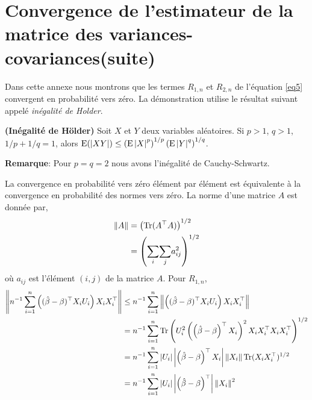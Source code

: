 \section{Convergence de l'estimateur de la matrice des variances-covariances(suite)}
Dans cette annexe nous montrons que les termes $R_{1,n}$ et $R_{2,n}$ de l'équation \eqref{eq5} convergent en probabilité vers zéro. La démonstration utilise le résultat suivant appelé \emph{inégalité de Holder}.
\begin{propriete}\textbf{(Inégalité de Hölder)} Soit $X$ et $Y$ deux variables aléatoires. Si $p>1$, $q>1$,  $1/p +1/q =1$,  alors $\operatorname{E}(\left\vert {XY} \right\vert) \leq \left(\operatorname{E}\left\vert {X} \right\vert^p\right)^{1/p}
\left(\operatorname{E}\left\vert {Y} \right\vert^q\right)^{1/q}$.
\end{propriete}
\textbf{Remarque}: Pour $p = q = 2$ nous avons l'inégalité de Cauchy-Schwartz.

La convergence en probabilité vers zéro élément par élément est équivalente à la convergence en probabilité des normes vers zéro. La norme d'une matrice $A$ est donnée par,
\begin{align*}
\left\Vert {A} \right\Vert& = \left(\operatorname{Tr}(A^\top A)\right)^{1/2}\\
&= \left(\underset{i}{\sum}\underset{j}{\sum}a_{ij}^2\right)^{1/2}
\end{align*}
où $a_{ij}$ est l'élément $(i, j)$ de la matrice $A$. Pour $R_{1,n}$,
\begin{align*}
\left\Vert {n^{-1}\sum_{i=1}^n\left((\hat{\beta}- \beta)^\top X_iU_i\right)X_iX_i^\top} \right\Vert &\leq 
n^{-1} \sum_{i=1}^n \left\Vert {\left((\hat{\beta}- \beta)^\top X_iU_i\right)X_iX_i^\top} \right\Vert\\
 &= n^{-1} \sum_{i=1}^n \operatorname{Tr}\left(U_i^2\left(\left(\hat{\beta}- \beta\right)^\top X_i\right)^2 X_iX_i^\top X_iX_i^\top\right)^{1/2}\\
 &=n^{-1} \sum_{i=1}^n \left\vert {U_i} \right\vert\left\vert {\left(\hat{\beta}- \beta\right)^\top X_i} \right\vert\left\Vert {X_i} \right\Vert\operatorname{Tr}(X_iX_i^\top)^{1/2} \\
 &=n^{-1}\sum_{i=1}^n \left\vert {U_i} \right\vert\left\vert {\left(\hat{\beta}- \beta\right)^\top} \right\vert\left\Vert {X_i} \right\Vert^2
\end{align*}

